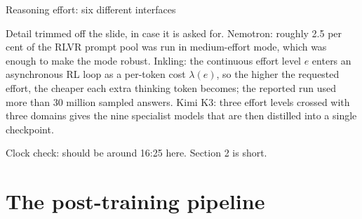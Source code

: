 \documentclass[aspectratio=169,10pt]{beamer}
\begin{document}
\begin{frame}[t,shrink=4]{Reasoning effort: six different interfaces}
{  Detail trimmed off the slide, in case it is asked for. Nemotron: roughly
  2.5 per cent of the RLVR prompt pool was run in medium-effort mode, which was
  enough to make the mode robust. Inkling: the continuous effort level $e$
  enters an asynchronous RL loop as a per-token cost $\lambda(e)$, so the
  higher the requested effort, the cheaper each extra thinking token becomes;
  the reported run used more than 30 million sampled answers. Kimi K3: three
  effort levels crossed with three domains gives the nine specialist models
  that are then distilled into a single checkpoint.

  Clock check: should be around 16:25 here. Section 2 is short.}
\end{frame}
\fi

\section{The post-training pipeline}
\end{document}
